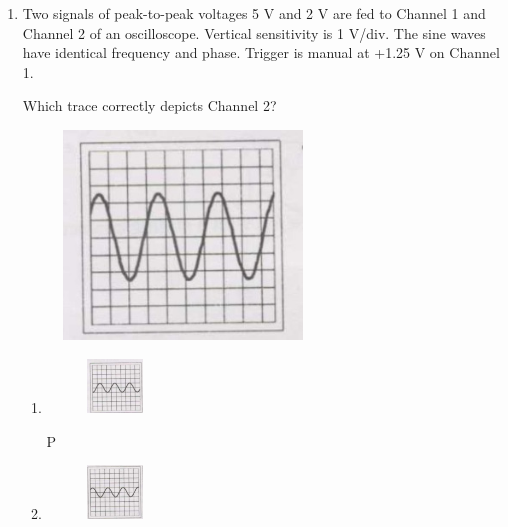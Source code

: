 \documentclass[journal]{IEEEtran}
\begin{document}
\begin{enumerate}
\begin{multicols}{4}
\begin{enumerate}
    \item $RC = 1$
    \item $R/C = 1$
    \item $R/C = 5$
    \item $C/R = 5$
\end{enumerate}
\end{multicols}
\hfill(GATE IN 2007)

\item Two signals of peak-to-peak voltages 5 V and 2 V are fed to Channel 1 and Channel 2 of an oscilloscope. Vertical sensitivity is 1 V/div. The sine waves have identical frequency and phase. Trigger is manual at +1.25 V on Channel 1. 

Which trace correctly depicts Channel 2?
\begin{figure}[H]
	\centering
      \includegraphics[width=0.6\textwidth]{53.jpg} 
      \caption{}
    \label{fig:fig53} 
\end{figure}
\begin{enumerate}
    \item      \begin{figure}[H]
      \includegraphics[width=0.15\textwidth]{54.jpg} 
      \caption{}
    \label{fig:fig54} 
\end{figure} P
    \item \begin{figure}[H]
      \includegraphics[width=0.15\textwidth]{55.jpg} 

\end{figure}
\end{enumerate}
\end{enumerate}
\end{document}
